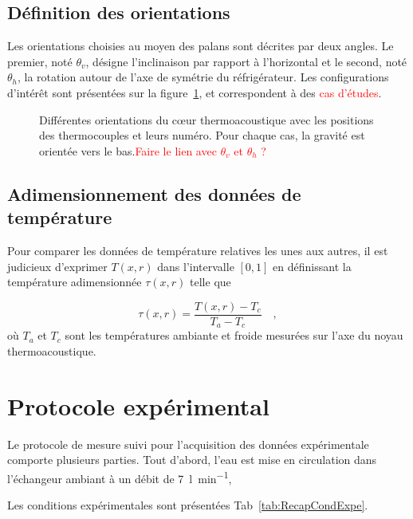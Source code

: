 \subsection{Définition des orientations}

Les orientations choisies au moyen des palans sont décrites par deux angles. Le premier, noté $\theta_v$, désigne l'inclinaison par rapport à l'horizontal et le second, noté $\theta_h$, la rotation autour de l'axe de symétrie du réfrigérateur. Les configurations d'intérêt sont présentées sur la figure~\ref{fig:OrientationCore}, et correspondent à des \textcolor{red}{cas d'études}.

\begin{figure}[!ht]
    \centering
    
    \caption{Différentes orientations du c\oe{}ur thermoacoustique avec les positions des thermocouples et leurs numéro. Pour chaque cas, la gravité est orientée vers le bas.\textcolor{red}{Faire le lien avec $\theta_v$ et $\theta_h$ ?}}
    \label{fig:OrientationCore}
\end{figure}


\subsection{Adimensionnement des données de température}

Pour comparer les données de température relatives les unes aux autres, il est judicieux d'exprimer $T(x,r)$ dans l'intervalle $[0,1]$ en définissant la température adimensionnée $\tau(x,r)$ telle que

\begin{equation}
    \tau(x,r) = \frac{T(x,r)-T_c}{T_a - T_c}\quad,
    \label{eq:TemperatureAdimension}
\end{equation}
où $T_a$ et $T_c$ sont les températures ambiante et froide mesurées sur l'axe du noyau thermoacoustique.


\section{Protocole expérimental}

Le protocole de mesure suivi pour l'acquisition des données expérimentale comporte plusieurs parties. Tout d'abord, l'eau est mise en circulation dans l'échangeur ambiant à un débit de \qty{7}{\l\per\minute},

Les conditions expérimentales sont présentées Tab~\ref{tab:RecapCondExpe}.

